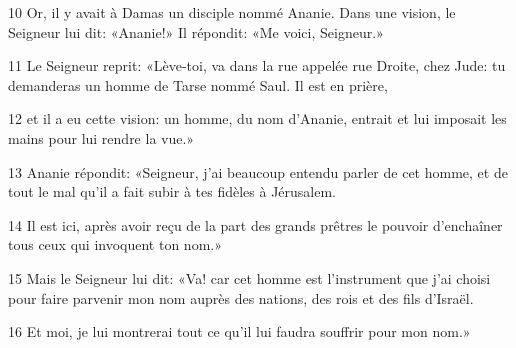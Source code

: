 
10 Or, il y avait à Damas un disciple nommé Ananie. Dans une vision, le Seigneur lui dit: «Ananie!» Il répondit: «Me voici, Seigneur.»

11 Le Seigneur reprit: «Lève-toi, va dans la rue appelée rue Droite, chez Jude: tu demanderas un homme de Tarse nommé Saul. Il est en prière,

12 et il a eu cette vision: un homme, du nom d’Ananie, entrait et lui imposait les mains pour lui rendre la vue.»

13 Ananie répondit: «Seigneur, j’ai beaucoup entendu parler de cet homme, et de tout le mal qu’il a fait subir à tes fidèles à Jérusalem.

14 Il est ici, après avoir reçu de la part des grands prêtres le pouvoir d’enchaîner tous ceux qui invoquent ton nom.»

15 Mais le Seigneur lui dit: «Va! car cet homme est l’instrument que j’ai choisi pour faire parvenir mon nom auprès des nations, des rois et des fils d’Israël.

16 Et moi, je lui montrerai tout ce qu’il lui faudra souffrir pour mon nom.»
